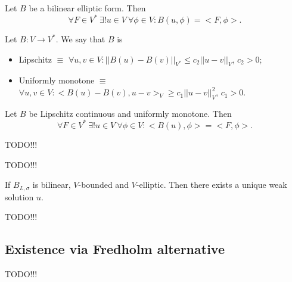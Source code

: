 \documentclass[12pt]{article}					%
\begin{document}
\begin{veta}
	Let $B$ be a bilinear elliptic form. Then
	$$ \forall F \in V^*\ \exists! u \in V\ \forall \phi \in V: B(u, \phi) = <F, \phi>. $$
\end{veta}

\begin{definice}
	Let $B: V \rightarrow V^*$. We say that $B$ is
	\begin{itemize}
		\item Lipschitz $≡$ $\forall u, v \in V: ||B(u) - B(v)||_{V^*} ≤ c_2 ||u - v||_V$, $c_2 > 0$;
		\item Uniformly monotone $≡$ $\forall u, v \in V: <B(u) - B(v), u - v>_V ≥ c_1 ||u - v||_V^2$, $c_1 > 0$.
	\end{itemize}
\end{definice}

\begin{veta}
	Let $B$ be Lipschitz continuous and uniformly monotone. Then
	$$ \forall F \in V^*\ \exists! u \in V\ \forall \phi \in V: <B(u), \phi> = <F, \phi>. $$

	\begin{dukazin}
		TODO!!!
	\end{dukazin}
\end{veta}

\begin{dukaz}
	TODO!!!
\end{dukaz}

\begin{veta}
	If $B_{L, \sigma}$ is bilinear, $V$-bounded and $V$-elliptic. Then there exists a unique weak solution $u$.

	\begin{dukazin}
		TODO!!!
	\end{dukazin}
\end{veta}

\subsection{Existence via Fredholm alternative}

TODO!!!

\end{document}
